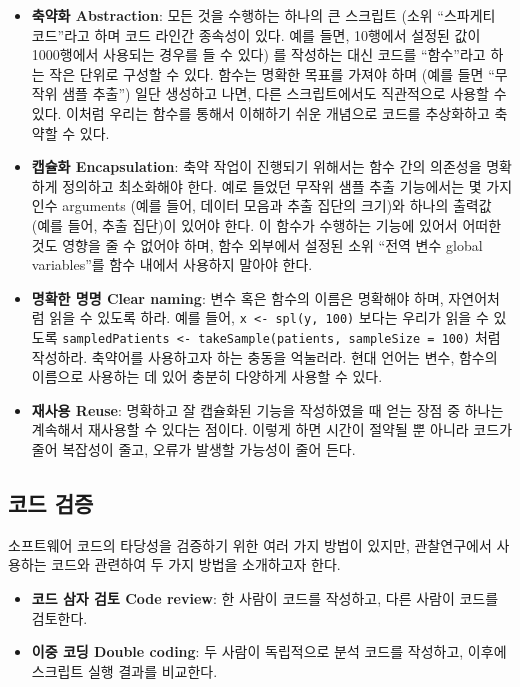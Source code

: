 \documentclass[10.5pt]{book}
\providecommand{\tightlist}{%
  \setlength{\itemsep}{0pt}\setlength{\parskip}{0pt}}
\theoremstyle{definition}
\theoremstyle{definition}
\theoremstyle{definition}
\theoremstyle{remark}
\begin{document}
\begin{itemize}
\tightlist
\item
  \textbf{축약화 Abstraction}: 모든 것을 수행하는 하나의 큰 스크립트
  (소위 ``스파게티 코드''라고 하며 코드 라인간 종속성이 있다. 예를 들면,
  10행에서 설정된 값이 1000행에서 사용되는 경우를 들 수 있다) 를
  작성하는 대신 코드를 ``함수''라고 하는 작은 단위로 구성할 수 있다.
  함수는 명확한 목표를 가져야 하며 (예를 들면 ``무작위 샘플 추출'') 일단
  생성하고 나면, 다른 스크립트에서도 직관적으로 사용할 수 있다. 이처럼
  우리는 함수를 통해서 이해하기 쉬운 개념으로 코드를 추상화하고 축약할
  수 있다.
\item
  \textbf{캡슐화 Encapsulation}: 축약 작업이 진행되기 위해서는 함수 간의
  의존성을 명확하게 정의하고 최소화해야 한다. 예로 들었던 무작위 샘플
  추출 기능에서는 몇 가지 인수 arguments (예를 들어, 데이터 모음과 추출
  집단의 크기)와 하나의 출력값 (예를 들어, 추출 집단)이 있어야 한다. 이
  함수가 수행하는 기능에 있어서 어떠한 것도 영향을 줄 수 없어야 하며,
  함수 외부에서 설정된 소위 ``전역 변수 global variables''를 함수 내에서
  사용하지 말아야 한다.
\item
  \textbf{명확한 명명 Clear naming}: 변수 혹은 함수의 이름은 명확해야
  하며, 자연어처럼 읽을 수 있도록 하라. 예를 들어,
  \texttt{x\ \textless{}-\ spl(y,\ 100)} 보다는 우리가 읽을 수 있도록
  \texttt{sampledPatients\ \textless{}-\ takeSample(patients,\ sampleSize\ =\ 100)}
  처럼 작성하라. 축약어를 사용하고자 하는 충동을 억눌러라. 현대 언어는
  변수, 함수의 이름으로 사용하는 데 있어 충분히 다양하게 사용할 수 있다.
\item
  \textbf{재사용 Reuse}: 명확하고 잘 캡슐화된 기능을 작성하였을 때 얻는
  장점 중 하나는 계속해서 재사용할 수 있다는 점이다. 이렇게 하면 시간이
  절약될 뿐 아니라 코드가 줄어 복잡성이 줄고, 오류가 발생할 가능성이
  줄어 든다.
\end{itemize}

\subsection{코드 검증}\label{-}

소프트웨어 코드의 타당성을 검증하기 위한 여러 가지 방법이 있지만,
관찰연구에서 사용하는 코드와 관련하여 두 가지 방법을 소개하고자 한다.

\begin{itemize}
\tightlist
\item
  \textbf{코드 삼자 검토 Code review}: 한 사람이 코드를 작성하고, 다른
  사람이 코드를 검토한다.
\item
  \textbf{이중 코딩 Double coding}: 두 사람이 독립적으로 분석 코드를
  작성하고, 이후에 스크립트 실행 결과를 비교한다.
\end{itemize}
\end{document}
